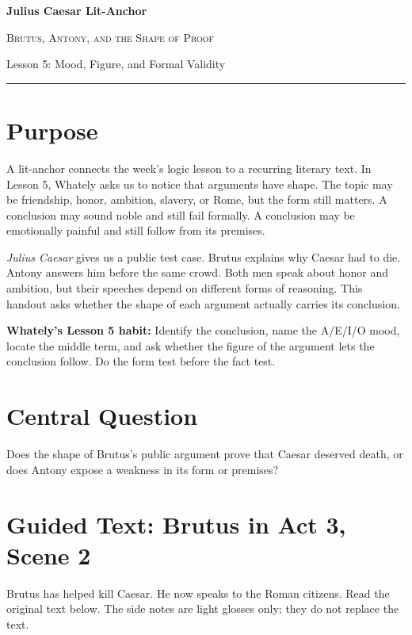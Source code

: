 \documentclass[12pt]{article}
\newcommand{\focusbox}[1]{\par\vspace{0.35em}\noindent\begingroup\setlength{\fboxsep}{6pt}\colorbox{gray!12}{\begin{minipage}{\dimexpr\linewidth-2\fboxsep\relax}#1\end{minipage}}\endgroup\par\vspace{0.45em}}
\begin{document}
\begin{center}
{\LARGE\bfseries Julius Caesar Lit-Anchor}\par\vspace{0.18em}
{\large\scshape Brutus, Antony, and the Shape of Proof}\par\vspace{0.35em}
{Lesson 5: Mood, Figure, and Formal Validity}\par\vspace{0.55em}
\rule{0.82\textwidth}{0.4pt}
\end{center}

\section*{Purpose}
A lit-anchor connects the week's logic lesson to a recurring literary text. In Lesson 5, Whately asks us to notice that arguments have shape. The topic may be friendship, honor, ambition, slavery, or Rome, but the form still matters. A conclusion may sound noble and still fail formally. A conclusion may be emotionally painful and still follow from its premises.

\textit{Julius Caesar} gives us a public test case. Brutus explains why Caesar had to die. Antony answers him before the same crowd. Both men speak about honor and ambition, but their speeches depend on different forms of reasoning. This handout asks whether the shape of each argument actually carries its conclusion.

\focusbox{\textbf{Whately's Lesson 5 habit:} Identify the conclusion, name the A/E/I/O mood, locate the middle term, and ask whether the figure of the argument lets the conclusion follow. Do the form test before the fact test.}

\section*{Central Question}
Does the shape of Brutus's public argument prove that Caesar deserved death, or does Antony expose a weakness in its form or premises?

\section*{Guided Text: Brutus in Act 3, Scene 2}
Brutus has helped kill Caesar. He now speaks to the Roman citizens. Read the original text below. The side notes are light glosses only; they do not replace the text.
\end{document}
